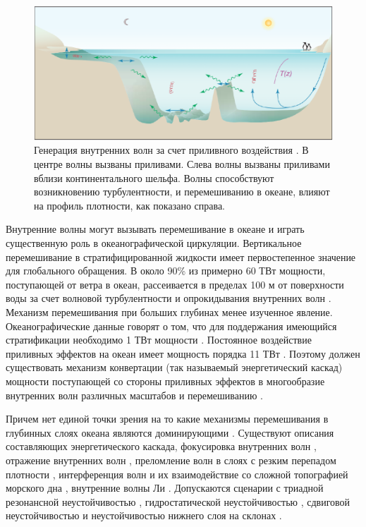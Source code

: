 \begin{figure}
    \centering
    \includegraphics[scale=0.6]{pics/IntGen.png}
    \caption{Генерация внутренних волн за счет приливного воздействия \cite{GarrettSc}. В центре волны вызваны приливами. Слева волны вызваны приливами вблизи континентального шельфа. Волны способствуют возникновению турбулентности, и перемешиванию в океане, влияют на профиль плотности, как показано справа.}
    \label{fig:intWaveGen}
\end{figure}

Внутренние волны могут вызывать перемешивание в океане и играть существенную роль в океанографической циркуляции. Вертикальное перемешивание в стратифицированной жидкости имеет первостепенное значение для глобального обращения. В около 90\% из примерно 60 ТВт мощности, поступающей от ветра в океан, рассеивается в пределах 100 м от поверхности воды \cite{Ferrari2009} за счет волновой турбулентности \cite{nazarenko2011wave, Yarom2014} и опрокидывания внутренних волн \cite{Perlin2013}. Механизм перемешивания при больших глубинах менее изученное явление. Океанографические данные говорят о том, что для поддержания имеющийся стратификации необходимо 1 ТВт мощности \cite{Munk1998}. Постоянное воздействие приливных эффектов на океан имеет мощность порядка 11 ТВт \cite{Garrett2007}. Поэтому должен существовать механизм конвертации (так называемый энергетический каскад) мощности поступающей со стороны приливных эффектов в многообразие внутренних волн различных масштабов и перемешиванию \cite{Munk1998}.

Причем нет единой точки зрения на то какие механизмы перемешивания в глубинных слоях океана являются доминирующими \cite{Ivey2008}. Существуют описания составляющих энергетического каскада, фокусировка внутренних волн \cite{BHLER2007}, отражение внутренних волн \cite{dauxois_young_1999}, преломление волн в слоях с резким перепадом плотности \cite{mathur_peacock_2009}, интерференция волн и их взаимодействие со сложной топографией морского дна \cite{ECHEVERRI2011}, внутренние волны Ли \cite{MacKinnon2013,Nikurashin2013}. Допускаются сценарии с триадной резонансной неустойчивостью \cite{Bourget2013}, гидростатической неустойчивостью \cite{mathur_peacock_2009}, сдвиговой неустойчивостью и неустойчивостью нижнего слоя на склонах \cite{Gayen2010, Lamb2014}.

